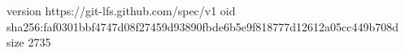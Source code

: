 version https://git-lfs.github.com/spec/v1
oid sha256:faf0301bbf4747d08f27459d93890fbde6b5e9f818777d12612a05cc449b708d
size 2735
